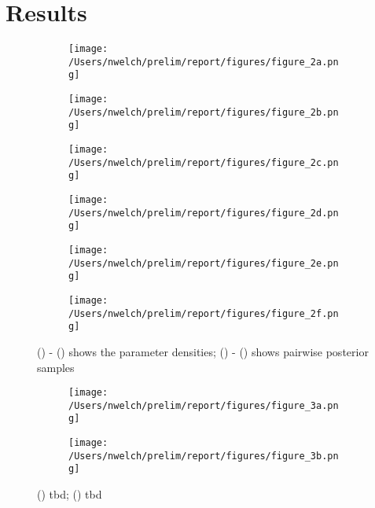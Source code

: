 \documentclass{uwstat572}
\begin{document}
\section{Results}
\begin{figure}[H]
	\centering
	\begin{subfigure}[b]{0.3\textwidth}
		\texttt{[image: /Users/nwelch/prelim/report/figures/figure\_2a.png]}
		\caption{}
		\label{fig:mu_density}
	\end{subfigure}
	\hfill
	\begin{subfigure}[b]{0.3\textwidth}
		\texttt{[image: /Users/nwelch/prelim/report/figures/figure\_2b.png]}
		\caption{}
		\label{fig:theta_density}
	\end{subfigure}
	\hfill
	\begin{subfigure}[b]{0.3\textwidth}
		\texttt{[image: /Users/nwelch/prelim/report/figures/figure\_2c.png]}
		\caption{}
		\label{fig:sigma_density}
	\end{subfigure} 
	\medskip
		\begin{subfigure}[b]{0.3\textwidth}
		\texttt{[image: /Users/nwelch/prelim/report/figures/figure\_2d.png]}
		\caption{}
		\label{fig:muSigma}
	\end{subfigure}
	\hfill
	\begin{subfigure}[b]{0.3\textwidth}
		\texttt{[image: /Users/nwelch/prelim/report/figures/figure\_2e.png]}
		\caption{}
		\label{fig:muTheta}
	\end{subfigure}
	\hfill
	\begin{subfigure}[b]{0.3\textwidth}
		\texttt{[image: /Users/nwelch/prelim/report/figures/figure\_2f.png]}
		\caption{}
		\label{fig:sigmaTheta}
	\end{subfigure} 
	\caption{() - () shows the parameter densities;  () - () shows pairwise posterior samples }
	\label{fig:sigmaTheta}
\end{figure} 



\begin{figure}[H]
	\centering
	\begin{subfigure}[b]{0.49\textwidth}
		\texttt{[image: /Users/nwelch/prelim/report/figures/figure\_3a.png]}
		\caption{}
		\label{fig:first_infections}
	\end{subfigure}
	\hfill
	\begin{subfigure}[b]{0.49\textwidth}
		\texttt{[image: /Users/nwelch/prelim/report/figures/figure\_3b.png]}
		\caption{}
		\label{fig:last_infections}
	\end{subfigure}
	\caption{() tbd; () tbd }
	\label{fig:data_plot}
\end{figure} 
\end{document}
